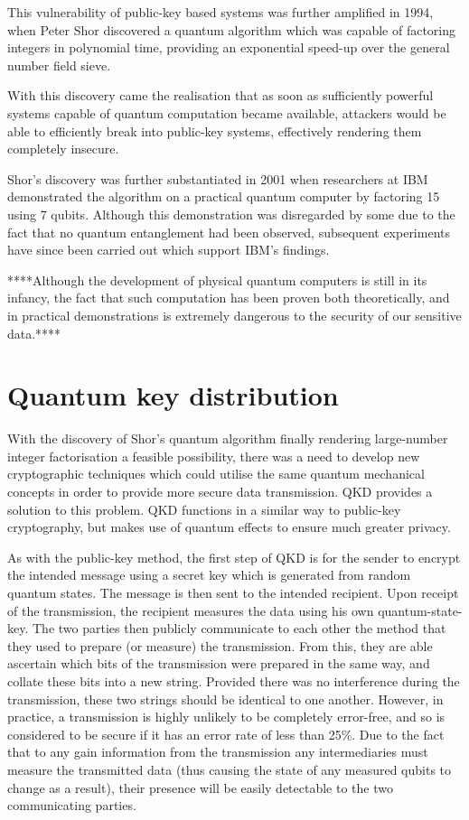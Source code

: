 \documentclass[runningheads,a4paper]{llncs}
\begin{document}
This vulnerability of public-key based systems was further amplified in 1994, when Peter Shor discovered a quantum algorithm which was capable of factoring integers in polynomial time, providing an exponential speed-up over the general number field sieve\cite{Shor:1994fk}. 

With this discovery came the realisation that as soon as sufficiently powerful systems capable of quantum computation became available, attackers would be able to efficiently break into public-key systems, effectively rendering them completely insecure.

Shor's discovery was further substantiated in 2001 when researchers at IBM demonstrated the algorithm on a practical quantum computer by factoring 15 using 7 qubits\cite{Vandersypen:2001fk}. Although this demonstration was disregarded by some due to the fact that no quantum entanglement had been observed, subsequent experiments have since been carried out which support IBM's findings\cite{Lu:2007uq}.

****Although the development of physical quantum computers is still in its infancy, the fact that such computation has been proven both theoretically, and in practical demonstrations is extremely dangerous to the security of our sensitive data.****

\section{Quantum key distribution}

With the discovery of Shor's quantum algorithm finally rendering large-number integer factorisation a feasible possibility, there was a need to develop new cryptographic techniques which could utilise the same quantum mechanical concepts in order to provide more secure data transmission. QKD provides a solution to this problem. QKD functions in a similar way to public-key cryptography, but makes use of quantum effects to ensure much greater privacy.

As with the public-key method, the first step of QKD is for the sender to encrypt the intended message using a secret key which is generated from random quantum states. The message is then sent to the intended recipient. Upon receipt of the transmission, the recipient measures the data using his own quantum-state-key. The two parties then publicly communicate to each other the method that they used to prepare (or measure) the transmission. From this, they are able ascertain which bits of the transmission were prepared in the same way, and collate these bits into a new string. Provided there was no interference during the transmission, these two strings should be identical to one another. However, in practice, a transmission is highly unlikely to be completely error-free, and so is considered to be secure if it has an error rate of less than 25\%\cite{Steane:1997zr}. Due to the fact that to any gain information from the transmission any intermediaries must measure the transmitted data (thus causing the state of any measured qubits to change as a result),  their presence will be easily detectable to the two communicating parties.
\end{document}
